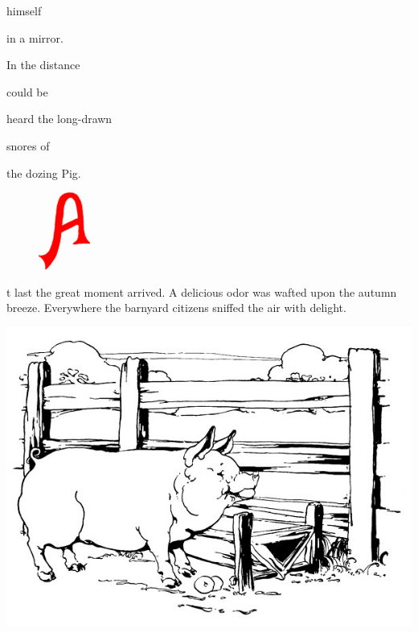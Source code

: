 \documentclass[letterpaper, 10pt, openany]{memoir}
\begin{document}
himself

\vspace{\onelineskip}

in a mirror.

\vspace{\onelineskip}

In the distance

\vspace{\onelineskip}

could be

\vspace{\onelineskip}

heard the long-drawn

\vspace{\onelineskip}

snores of

\vspace{\onelineskip}

the dozing Pig.

\newpage
\begin{figure}
	\includegraphics[width=0.15\textwidth]{image_005_1.jpg}
\end{figure}

t last the great moment arrived. A delicious odor was wafted upon the autumn breeze. Everywhere
the barnyard citizens sniffed the air with delight.

\begin{center}
	\includegraphics[width=\textwidth]{image_012_2.jpg}
\end{center}
\end{document}
